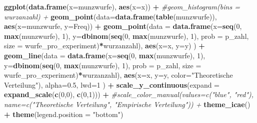 \documentclass[]{book}
\newenvironment{Shaded}{\begin{snugshade}}{\end{snugshade}}
\newcommand{\KeywordTok}[1]{\textcolor[rgb]{0.13,0.29,0.53}{\textbf{#1}}}
\newcommand{\DataTypeTok}[1]{\textcolor[rgb]{0.13,0.29,0.53}{#1}}
\newcommand{\DecValTok}[1]{\textcolor[rgb]{0.00,0.00,0.81}{#1}}
\newcommand{\FloatTok}[1]{\textcolor[rgb]{0.00,0.00,0.81}{#1}}
\newcommand{\StringTok}[1]{\textcolor[rgb]{0.31,0.60,0.02}{#1}}
\newcommand{\CommentTok}[1]{\textcolor[rgb]{0.56,0.35,0.01}{\textit{#1}}}
\newcommand{\OperatorTok}[1]{\textcolor[rgb]{0.81,0.36,0.00}{\textbf{#1}}}
\newcommand{\NormalTok}[1]{#1}
\begin{document}
\begin{Shaded}
\begin{Highlighting}[]
\KeywordTok{ggplot}\NormalTok{(}\KeywordTok{data.frame}\NormalTok{(}\DataTypeTok{x=}\NormalTok{munzwurfe), }\KeywordTok{aes}\NormalTok{(}\DataTypeTok{x=}\NormalTok{x)) }\OperatorTok{+}
\StringTok{  }\CommentTok{#geom_histogram(bins = wurzanzahl) +}
\StringTok{  }\KeywordTok{geom_point}\NormalTok{(}\DataTypeTok{data=}\KeywordTok{data.frame}\NormalTok{(}\KeywordTok{table}\NormalTok{(munzwurfe)), }
             \KeywordTok{aes}\NormalTok{(}\DataTypeTok{x=}\NormalTok{munzwurfe, }\DataTypeTok{y=}\NormalTok{Freq)) }\OperatorTok{+}
\StringTok{  }\KeywordTok{geom_point}\NormalTok{(}\DataTypeTok{data =} \KeywordTok{data.frame}\NormalTok{(}\DataTypeTok{x=}\KeywordTok{seq}\NormalTok{(}\DecValTok{0}\NormalTok{, }\KeywordTok{max}\NormalTok{(munzwurfe), }\DecValTok{1}\NormalTok{), }
                               \DataTypeTok{y=}\KeywordTok{dbinom}\NormalTok{(}\KeywordTok{seq}\NormalTok{(}\DecValTok{0}\NormalTok{, }\KeywordTok{max}\NormalTok{(munzwurfe), }\DecValTok{1}\NormalTok{), }\DataTypeTok{prob =}\NormalTok{ p_zahl, }
                                        \DataTypeTok{size =}\NormalTok{ wurfe_pro_experiment)}\OperatorTok{*}\NormalTok{wurzanzahl), }
             \KeywordTok{aes}\NormalTok{(}\DataTypeTok{x=}\NormalTok{x, }\DataTypeTok{y=}\NormalTok{y)}
\NormalTok{             ) }\OperatorTok{+}
\StringTok{    }\KeywordTok{geom_line}\NormalTok{(}\DataTypeTok{data =} \KeywordTok{data.frame}\NormalTok{(}\DataTypeTok{x=}\KeywordTok{seq}\NormalTok{(}\DecValTok{0}\NormalTok{, }\KeywordTok{max}\NormalTok{(munzwurfe), }\DecValTok{1}\NormalTok{), }
                               \DataTypeTok{y=}\KeywordTok{dbinom}\NormalTok{(}\KeywordTok{seq}\NormalTok{(}\DecValTok{0}\NormalTok{, }\KeywordTok{max}\NormalTok{(munzwurfe), }\DecValTok{1}\NormalTok{), }\DataTypeTok{prob =}\NormalTok{ p_zahl, }
                                        \DataTypeTok{size =}\NormalTok{ wurfe_pro_experiment)}\OperatorTok{*}\NormalTok{wurzanzahl), }
             \KeywordTok{aes}\NormalTok{(}\DataTypeTok{x=}\NormalTok{x, }\DataTypeTok{y=}\NormalTok{y, }\DataTypeTok{color=}\StringTok{"Theoretische Verteilung"}\NormalTok{), }\DataTypeTok{alpha=}\FloatTok{0.5}\NormalTok{, }\DataTypeTok{lwd=}\DecValTok{1}
\NormalTok{             ) }\OperatorTok{+}
\StringTok{  }\KeywordTok{scale_y_continuous}\NormalTok{(}\DataTypeTok{expand =} \KeywordTok{expand_scale}\NormalTok{(}\KeywordTok{c}\NormalTok{(}\DecValTok{0}\NormalTok{,}\DecValTok{0}\NormalTok{), }\KeywordTok{c}\NormalTok{(}\DecValTok{0}\NormalTok{,}\DecValTok{1}\NormalTok{))) }\OperatorTok{+}
\StringTok{  }\CommentTok{#scale_color_manual(values=c("blue", "red"), name=c("Theoretische Verteilung", "Empirische Verteilung")) +}
\StringTok{  }\KeywordTok{theme_icae}\NormalTok{() }\OperatorTok{+}\StringTok{ }\KeywordTok{theme}\NormalTok{(}\DataTypeTok{legend.position =} \StringTok{"bottom"}\NormalTok{)}
\end{Highlighting}
\end{Shaded}
\end{document}
